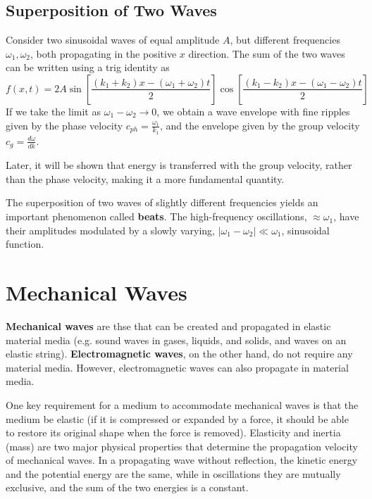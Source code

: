 \documentclass[12pt, a4paper, oneside, openright, titlepage]{book}
\begin{document}
\subsection{Superposition of Two Waves}

Consider two sinusoidal waves of equal amplitude $A$, but different frequencies $\omega_1,\omega_2$, both propagating in the positive $x$ direction. The sum of the two waves can be written using a trig identity as
\begin{equation}
    f(x,t) = 2A\sin\left[\frac{(k_1+k_2)x-(\omega_1+\omega_2)t}{2}\right]\cos\left[\frac{(k_1-k_2)x-(\omega_1-\omega_2)t}{2}\right]
\end{equation}
If we take the limit as $\omega_1-\omega_2\rightarrow 0$, we obtain a wave envelope with fine ripples given by the phase velocity $c_{ph} = \frac{\omega_1}{k_1}$, and the envelope given by the group velocity $c_g = \frac{d\omega}{dk}$.

Later, it will be shown that energy is transferred with the group velocity, rather than the phase velocity, making it a more fundamental quantity. 

The superposition of two waves of slightly different frequencies yields an important phenomenon called \textbf{beats}. The high-frequency oscillations, $\approx \omega_1$, have their amplitudes modulated by a slowly varying, $|\omega_1-\omega_2|\ll \omega_1$, sinusoidal function.




\section{Mechanical Waves}

\begin{defn}
    \textbf{Mechanical waves} are thse that can be created and propagated in elastic material media (e.g. sound waves in gases, liquids, and solids, and waves on an elastic string). \textbf{Electromagnetic waves}, on the other hand, do not require any material media. However, electromagnetic waves can also propagate in material media.
\end{defn}

One key requirement for a medium to accommodate mechanical waves is that the medium be elastic (if it is compressed or expanded by a force, it should be able to restore its original shape when the force is removed). Elasticity and inertia (mass) are two major physical properties that determine the propagation velocity of mechanical waves. In a propagating wave without reflection, the kinetic energy and the potential energy are the same, while in oscillations they are mutually exclusive, and the sum of the two energies is a constant.
\end{document}
